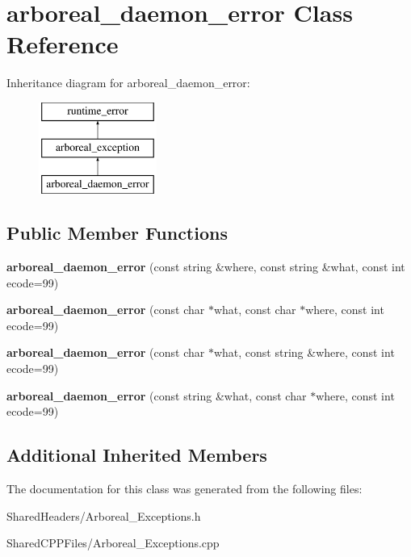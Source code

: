 \hypertarget{classarboreal__daemon__error}{}\section{arboreal\+\_\+daemon\+\_\+error Class Reference}
\label{classarboreal__daemon__error}
Inheritance diagram for arboreal\+\_\+daemon\+\_\+error\+:\begin{figure}[H]
\begin{center}
\leavevmode
\includegraphics[height=3.000000cm]{classarboreal__daemon__error}
\end{center}
\end{figure}
\subsection*{Public Member Functions}
\begin{DoxyCompactItemize}
\item 
{\bfseries arboreal\+\_\+daemon\+\_\+error} (const string \&where, const string \&what, const int ecode=99)\hypertarget{classarboreal__daemon__error_aaa483ea710b1c20f37a61b7be7cd64fd}{}\label{classarboreal__daemon__error_aaa483ea710b1c20f37a61b7be7cd64fd}

\item 
{\bfseries arboreal\+\_\+daemon\+\_\+error} (const char $\ast$what, const char $\ast$where, const int ecode=99)\hypertarget{classarboreal__daemon__error_a4a8b88442bf94bf88ffa162c8e8f76ef}{}\label{classarboreal__daemon__error_a4a8b88442bf94bf88ffa162c8e8f76ef}

\item 
{\bfseries arboreal\+\_\+daemon\+\_\+error} (const char $\ast$what, const string \&where, const int ecode=99)\hypertarget{classarboreal__daemon__error_a32d6c4b31f97c709952f44e15fd6bf8a}{}\label{classarboreal__daemon__error_a32d6c4b31f97c709952f44e15fd6bf8a}

\item 
{\bfseries arboreal\+\_\+daemon\+\_\+error} (const string \&what, const char $\ast$where, const int ecode=99)\hypertarget{classarboreal__daemon__error_adc8e08526e65a9707c55b674c8d02044}{}\label{classarboreal__daemon__error_adc8e08526e65a9707c55b674c8d02044}

\end{DoxyCompactItemize}
\subsection*{Additional Inherited Members}


The documentation for this class was generated from the following files\+:\begin{DoxyCompactItemize}
\item 
Shared\+Headers/Arboreal\+\_\+\+Exceptions.\+h\item 
Shared\+C\+P\+P\+Files/Arboreal\+\_\+\+Exceptions.\+cpp\end{DoxyCompactItemize}
